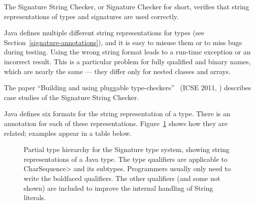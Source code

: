 
The Signature String Checker, or Signature Checker for short, verifies that
string representations of types and signatures are used correctly.

Java defines multiple different string representations for types (see
Section~\ref{signature-annotations}), and it is easy to
misuse them or to miss bugs during testing.  Using the wrong string format
leads to a run-time exception or an incorrect result.  This is a particular
problem for fully qualified and binary names, which are nearly the same ---
they differ only for nested classes and arrays.

The paper ``Building and using pluggable
type-checkers''~\cite{DietlDEMS2011} (ICSE 2011,
)
describes case studies of the Signature String Checker.



Java defines six formats for the string representation of a type.
There is an annotation for each of these representations.
Figure~\ref{fig-signature-hierarchy} shows how they are related;
examples appear in a table below.

\begin{figure}
\caption{Partial type hierarchy for the Signature type system, showing
  string representations of a Java type.
  The type qualifiers are applicable to \<CharSequence> and its subtypes.
  Programmers usually only need to write
  the boldfaced qualifiers.  The other qualifiers (and some not shown) are
  included to improve the internal handling of String literals.}
\label{fig-signature-hierarchy}
\end{figure}

\label{signature-annotations-descriptions}

